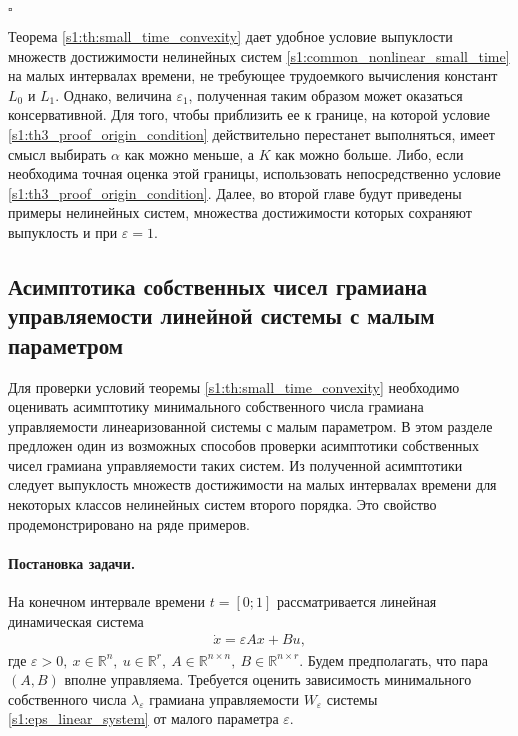 \documentclass[../main.tex]{subfiles}
\begin{document}
 \hfill$\square$\\[1ex]%
 
 \begin{zam}
 	Теорема \ref{s1:th:small_time_convexity} дает удобное условие выпуклости множеств достижимости нелинейных систем \eqref{s1:common_nonlinear_small_time} на малых интервалах времени, не требующее трудоемкого вычисления констант $L_0$ и $L_1$.
 	Однако, величина $\varepsilon_1$, полученная таким образом может оказаться консервативной. 
 	Для того, чтобы приблизить ее к границе, на которой условие \eqref{s1:th3_proof_origin_condition} действительно перестанет выполняться, имеет смысл выбирать $\alpha$ как можно меньше, а $K$ как можно больше. 
 	Либо, если необходима точная оценка этой границы, использовать непосредственно условие \eqref{s1:th3_proof_origin_condition}.
 	Далее, во второй главе будут приведены примеры нелинейных систем, множества достижимости которых сохраняют выпуклость и при $ \varepsilon = 1$.
 \end{zam}
 \subsection{Асимптотика собственных чисел грамиана управляемости линейной системы с малым параметром} 
Для проверки условий теоремы \ref{s1:th:small_time_convexity} необходимо оценивать асимптотику минимального собственного числа грамиана управляемости линеаризованной системы с малым параметром.
В этом разделе предложен один из возможных способов проверки асимптотики собственных чисел грамиана управляемости таких систем.
Из полученной асимптотики следует выпуклость множеств достижимости на малых интервалах времени для некоторых классов нелинейных систем второго порядка.
Это свойство продемонстрировано на ряде примеров.

\paragraph{Постановка задачи.} На конечном интервале времени $ t = [0;1] $ рассматривается линейная динамическая система 
\begin{gather}\label{s1:eps_linear_system}
     \dot{x} = \varepsilon A x + Bu, 
\end{gather}
где $ \varepsilon > 0, \ x \in \mathbb{R}^n, \ u \in \mathbb{R}^r, \ A \in \mathbb{R}^{n\times n}, \ B \in \mathbb{R}^{n\times r}  $.
Будем предполагать, что пара $ \left( A, B\right)  $ вполне управляема.
Требуется оценить зависимость минимального собственного числа $ \lambda_{\varepsilon} $ грамиана управляемости $ W_{\varepsilon} $ системы \eqref{s1:eps_linear_system} от малого параметра $ \varepsilon  $.
\end{document}

